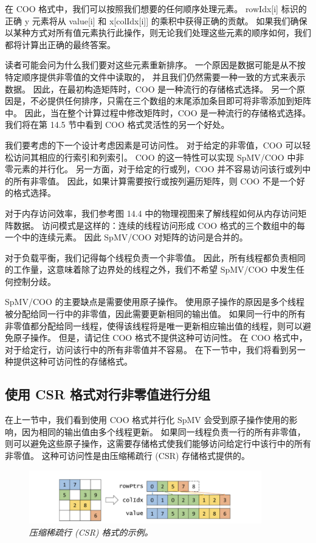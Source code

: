 在 COO 格式中，我们可以按照我们想要的任何顺序处理元素。 
rowIdx[i] 标识的正确 y 元素将从 value[i] 和 x[colIdx[i]] 的乘积中获得正确的贡献。 
如果我们确保以某种方式对所有值元素执行此操作，则无论我们处理这些元素的顺序如何，我们都将计算出正确的最终答案。

读者可能会问为什么我们要对这些元素重新排序。 一个原因是数据可能是从不按特定顺序提供非零值的文件中读取的，
并且我们仍然需要一种一致的方式来表示数据。 因此，在最初构造矩阵时，$\mathrm{COO}$ 是一种流行的存储格式选择。 
另一个原因是，不必提供任何排序，只需在三个数组的末尾添加条目即可将非零添加到矩阵中。 
因此，当在整个计算过程中修改矩阵时，$\mathrm{COO}$ 是一种流行的存储格式选择。 
我们将在第 14.5 节中看到 COO 格式灵活性的另一个好处。

我们要考虑的下一个设计考虑因素是可访问性。 对于给定的非零值，COO 可以轻松访问其相应的行索引和列索引。 
$\mathrm{COO}$ 的这一特性可以实现 SpMV/COO 中非零元素的并行化。 
另一方面，对于给定的行或列，COO 并不容易访问该行或列中的所有非零值。 
因此，如果计算需要按行或按列遍历矩阵，则 $\mathrm{COO}$ 不是一个好的格式选择。

对于内存访问效率，我们参考图 14.4 中的物理视图来了解线程如何从内存访问矩阵数据。 
访问模式是这样的：连续的线程访问形成 COO 格式的三个数组中的每一个中的连续元素。 因此 SpMV/COO 对矩阵的访问是合并的。

对于负载平衡，我们记得每个线程负责一个非零值。 
因此，所有线程都负责相同的工作量，这意味着除了边界处的线程之外，我们不希望 SpMV/COO 中发生任何控制分歧。

SpMV/COO 的主要缺点是需要使用原子操作。 使用原子操作的原因是多个线程被分配给同一行中的非零值，因此需要更新相同的输出值。 
如果同一行中的所有非零值都分配给同一线程，使得该线程将是唯一更新相应输出值的线程，则可以避免原子操作。 
但是，请记住 $\mathrm{COO}$ 格式不提供这种可访问性。 
在 $\mathrm{COO}$ 格式中，对于给定行，访问该行中的所有非零值并不容易。 
在下一节中，我们将看到另一种提供这种可访问性的存储格式。

\subsection{使用 CSR 格式对行非零值进行分组}
在上一节中，我们看到使用 COO 格式并行化 SpMV 会受到原子操作使用的影响，因为相同的输出值由多个线程更新。 
如果同一线程负责一行的所有非零值，则可以避免这些原子操作，这需要存储格式使我们能够访问给定行中该行中的所有非零值。 
这种可访问性是由压缩稀疏行 (CSR) 存储格式提供的。

\begin{figure}[H]
	\centering
	\includegraphics[width=0.9\textwidth]{figs/F14.7.png}
	\caption{\textit{压缩稀疏行 (CSR) 格式的示例。}}
\end{figure}

